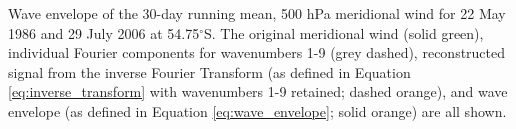 \label{fig:example_hilbert}
Wave envelope of the 30-day running mean, 500 hPa meridional wind for 22 May 1986 and 29 July 2006 at 54.75$^{\circ}$S. The original meridional wind (solid green), individual Fourier components for wavenumbers 1-9 (grey dashed), reconstructed signal from the inverse Fourier Transform (as defined in Equation \ref{eq:inverse_transform} with wavenumbers 1-9 retained; dashed orange), and wave envelope (as defined in Equation \ref{eq:wave_envelope}; solid orange) are all shown.